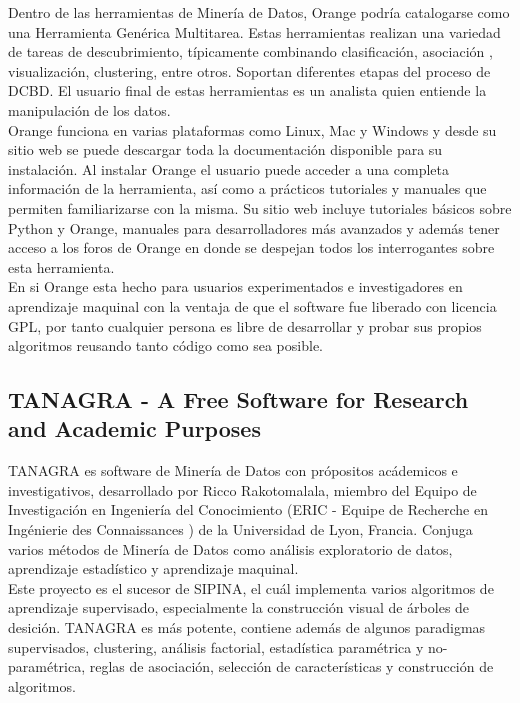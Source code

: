 Dentro de las herramientas de Miner\'ia de Datos, Orange podr\'ia catalogar\-se como una Herramienta Gen\'erica
Multitarea. Estas herramientas realizan una variedad de tareas de descubrimiento, t\'ipicamente combinando
clasificaci\'on, asociaci\'on , visualizaci\'on, clustering, entre otros. Soportan diferentes etapas del proceso
de DCBD.  El usuario final de estas herramientas  es un analista quien entiende la manipulaci\'on de los datos.\\

Orange funciona en varias plataformas como Linux, Mac y Windows y desde su sitio web \cite{oran} se puede
descargar toda la documentaci\'on disponible para su instalaci\'on. Al instalar Orange el usuario puede acceder a
una completa informaci\'on de la herramienta, as\'i como a pr\'acticos tutoriales y manuales que permiten
familiarizarse con la misma. Su sitio web \cite{oran} incluye tutoriales b\'asicos sobre Python y Orange,
manuales para desarrolladores m\'as avanzados y adem\'as tener acceso a los foros de Orange en donde se despejan
todos los interrogantes sobre esta herramienta.\\

En si Orange esta hecho para usuarios experimentados e investigadores en aprendizaje maquinal con la ventaja de
que el software fue liberado con licencia GPL, por tanto cualquier persona es libre de desarrollar y probar sus
propios algoritmos reusando tanto c\'odigo como sea posible.

\subsection{TANAGRA - A Free Software for Research and Academic Purposes}

TANAGRA \cite{rico} es software de Miner\'ia de Datos con pr\'opositos ac\'ademicos e investigativos,
desarrollado por Ricco Rakotomalala, miembro del Equipo de Investigaci\'on en Ingenier\'ia del Conocimiento (ERIC
- Equipe de Recherche en Ing\'enierie des Connaissances \cite{eric}) de la Universidad de Lyon, Francia. Conjuga
varios m\'etodos de Miner\'ia de Datos como an\'alisis exploratorio de datos, aprendizaje estad\'istico y
aprendizaje maquinal.\\

Este proyecto es el sucesor de SIPINA, el cu\'al implementa varios algoritmos de aprendizaje supervisado,
especialmente la construcci\'on visual de \'arboles de desici\'on. TANAGRA es m\'as potente, contiene adem\'as de
algunos paradigmas supervisados, clustering, an\'alisis factorial, estad\'istica param\'etrica y
no-param\'etrica, reglas de asociaci\'on, selecci\'on de caracter\'isticas y cons\-trucci\'on de algoritmos.\\

